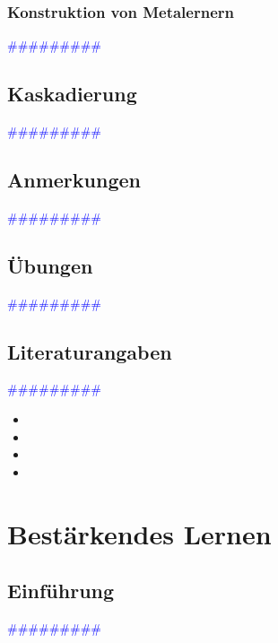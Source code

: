 \documentclass{article}
\begin{document}
    \subsubsection{Konstruktion von Metalernern} %
      \textcolor{blue}{\#\#\#\#\#\#\#\#\#}
  \subsection{Kaskadierung} %
      \textcolor{blue}{\#\#\#\#\#\#\#\#\#}
  \subsection{Anmerkungen} %
      \textcolor{blue}{\#\#\#\#\#\#\#\#\#}
  \subsection{Übungen} %
      \textcolor{blue}{\#\#\#\#\#\#\#\#\#}
  \subsection{Literaturangaben} %
      \textcolor{blue}{\#\#\#\#\#\#\#\#\#}

      \begin{itemize}
      \color{red}
        \item 
        \item
      \color{ForestGreen}
        \item 
        \item
      \end{itemize}




\newpage
\section{Bestärkendes Lernen} %
  \subsection{Einführung} %
      \textcolor{blue}{\#\#\#\#\#\#\#\#\#}
\end{document}

